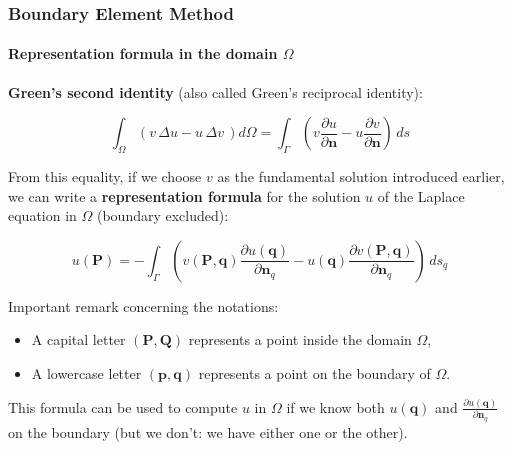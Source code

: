 \documentclass[10pt,xcolor=pdftex,dvipsnames,table]{beamer}
\begin{document}
\begin{frame}
	\frametitle{ Boundary Element Method }
	\framesubtitle{ Representation formula in the domain $\Omega$ }
	
	\textbf{Green's second identity} (also called Green's reciprocal identity):
	
	\begin{equation*}
		\int_{\Omega} \left( v\,\Delta u - u\,\Delta v\, \right) d\Omega 
		=
		\int_{\Gamma} \left( v \frac{\partial u}{\partial \boldsymbol{n}} - u \frac{\partial v}{\partial \boldsymbol{n}} \right)\, ds
	\end{equation*}
	
	
	
	
	From this equality, if we choose $v$ as the fundamental solution introduced earlier, we can write a \textbf{representation formula} for the solution $u$ of the Laplace equation in $\Omega$ (boundary excluded):
	
	\begin{equation*}
		u(\boldsymbol{P}) = - \int_{\Gamma} \left( v(\boldsymbol{P},\boldsymbol{q}) \frac{\partial u(\boldsymbol{q})}{\partial \boldsymbol{n}_q} - u(\boldsymbol{q}) \frac{\partial v(\boldsymbol{P},\boldsymbol{q})}{\partial \boldsymbol{n}_q} \right)\, ds_q
	\end{equation*}	
	
	
	Important remark concerning the notations:
	\begin{itemize}
		\item A capital letter $(\boldsymbol{P}, \boldsymbol{Q})$ represents a point inside the domain $\Omega$,
		\item A lowercase letter $(\boldsymbol{p},\boldsymbol{q})$ represents a point on the boundary of $\Omega$.
	\end{itemize}
	
	This formula can be used to compute $u$ in $\Omega$ if we know both $u(\boldsymbol{q})$ and $\frac{\partial u(\boldsymbol{q})}{\partial \boldsymbol{n}_q}$ on the boundary (but we don't: we have either one or the other).
	
\end{frame}
\end{document}
